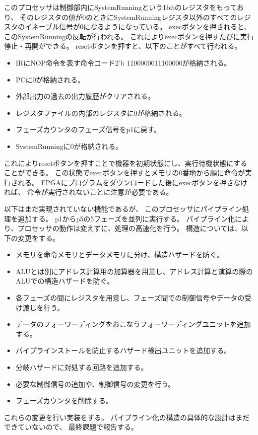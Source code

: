 \documentclass[a4j,titlepage]{jarticle}
\begin{document}
このプロセッサは制御部内にSystemRunningという1bitのレジスタをもっており、
そのレジスタの値が0のときにSystemRunningレジスタ以外のすべてのレジスタのイネーブル信号が0になるようになっている。
execボタンを押されると、このSystemRunningの反転が行われる。
これによりexecボタンを押すたびに実行停止・再開ができる。
resetボタンを押すと、以下のことがすべて行われる。
\begin{itemize}
\item IRにNOP命令を表す命令コード2'b 1100000011100000が格納される。
\item PCに0が格納される。
\item 外部出力の過去の出力履歴がクリアされる。
\item レジスタファイルの内部のレジスタに0が格納される。
\item フェーズカウンタのフェーズ信号をp1に戻す。
\item SystemRunningに0が格納される。
\end{itemize}
これによりresetボタンを押すことで機器を初期状態にし、実行待機状態にすることができる。
この状態でexecボタンを押すとメモリの0番地から順に命令が実行される。
FPGAにプログラムをダウンロードした後にexecボタンを押さなければ、
命令が実行されないことに注意が必要である。

以下はまだ実現されていない機能であるが、
このプロセッサにパイプライン処理を追加する。
p1からp5の5フェーズを並列に実行する。
パイプライン化により、プロセッサの動作は変えずに、処理の高速化を行う。
構造については、以下の変更をする。
\begin{itemize}
\item メモリを命令メモリとデータメモリに分け、構造ハザードを防ぐ。
\item ALUとは別にアドレス計算用の加算器を用意し、アドレス計算と演算の際のALUでの構造ハザードを防ぐ。
\item 各フェーズの間にレジスタを用意し、フェーズ間での制御信号やデータの受け渡しを行う。
\item データのフォーワーディングをおこなうフォーワーディングユニットを追加する。
\item パイプラインストールを防止するハザード検出ユニットを追加する。
\item 分岐ハザードに対処する回路を追加する。
\item 必要な制御信号の追加や、制御信号の変更を行う。
\item フェーズカウンタを削除する。
\end{itemize}
これらの変更を行い実装をする。
パイプライン化の構造の具体的な設計はまだできていないので、
最終課題で報告する。
\end{document}
